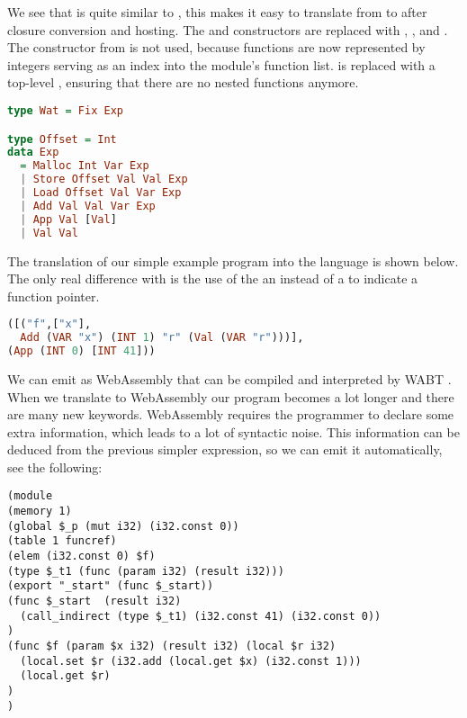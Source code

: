 {We see that  is quite similar to , this makes it easy to translate from  to  after closure conversion and hosting. The  and  constructors are replaced with , , and . The  constructor from  is not used, because functions are now represented by integers serving as an index into the module's function list.  is replaced with a top-level , ensuring that there are no nested functions anymore.

\begin{lstlisting}[language=Haskell]
type Wat = Fix Exp

type Offset = Int
data Exp
  = Malloc Int Var Exp
  | Store Offset Val Val Exp
  | Load Offset Val Var Exp
  | Add Val Val Var Exp
  | App Val [Val]
  | Val Val
\end{lstlisting}

The translation of our simple example program  into the  language is shown below. The only real difference with  is the use of the an  instead of a  to indicate a function pointer.

\begin{lstlisting}[language=Haskell]
([("f",["x"],
  Add (VAR "x") (INT 1) "r" (Val (VAR "r")))],
(App (INT 0) [INT 41]))
\end{lstlisting}

We can emit  as WebAssembly that can be compiled and interpreted by WABT \autocite{wabt}. When we translate to WebAssembly our program becomes a lot longer and there are many new keywords. WebAssembly requires the programmer to declare some extra information, which leads to a lot of syntactic noise. This information can be deduced from the previous simpler  expression, so we can emit it automatically, see the following:

\begin{lstlisting}
(module
(memory 1)
(global $_p (mut i32) (i32.const 0))
(table 1 funcref)
(elem (i32.const 0) $f)
(type $_t1 (func (param i32) (result i32)))
(export "_start" (func $_start))
(func $_start  (result i32)
  (call_indirect (type $_t1) (i32.const 41) (i32.const 0))
)
(func $f (param $x i32) (result i32) (local $r i32)
  (local.set $r (i32.add (local.get $x) (i32.const 1)))
  (local.get $r)
)
)
\end{lstlisting}

}
